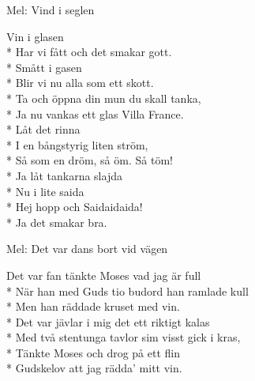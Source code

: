 \begin{SongText}
    \begin{SongInfo}
        Mel: Vind i seglen
    \end{SongInfo}
    \begin{SongVerse}
        Vin i glasen\\*%
        Har vi fått och det smakar gott.\\*%
        Smått i gasen\\*%
        Blir vi nu alla som ett skott.\\*%
        Ta och öppna din mun du skall tanka,\\*%
        Ja nu vankas ett glas Villa France.\\*%
        Låt det rinna\\*%
        I en bångstyrig liten ström,\\*%
        Så som en dröm, så öm. Så töm!\\*%
        Ja låt tankarna slajda\\*%
        Nu i lite saida\\*%
        Hej hopp och Saidaidaida!\\*%
        Ja det smakar bra.
    \end{SongVerse}
\end{SongText}
\begin{SongText}
    \begin{SongInfo}
        Mel: Det var dans bort vid vägen
    \end{SongInfo}
    \begin{SongVerse}
        Det var fan tänkte Moses vad jag är full\\*%
        När han med Guds tio budord han ramlade kull\\*%
        Men han räddade kruset med vin.\\*%
        Det var jävlar i mig det ett riktigt kalas\\*%
        Med två stentunga tavlor sim visst gick i kras,\\*%
        Tänkte Moses och drog på ett flin\\*%
        Gudskelov att jag rädda’ mitt vin.
    \end{SongVerse}
\end{SongText}
